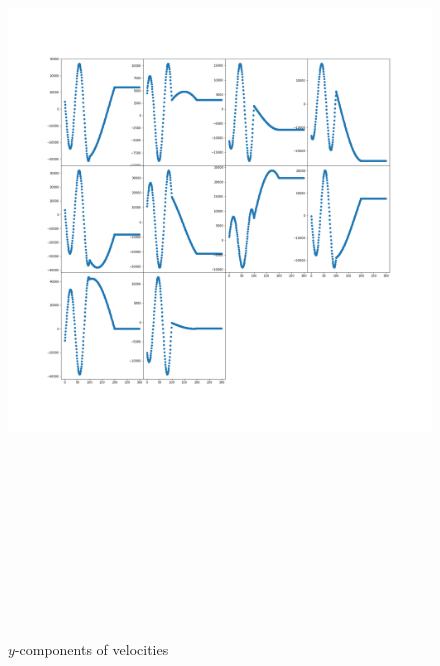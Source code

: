 \documentclass[12pt]{article}
\begin{document}
	\begin{figure}[H]
		\includegraphics[width=\linewidth, height=22cm]{subvsy3.png} \caption{$y$-components of velocities} \label{subvsy3}
	\end{figure}
\end{document}
